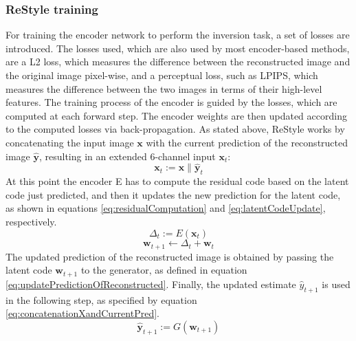 \subsubsection{ReStyle training}
For training the encoder network to perform the inversion task, a set of losses are introduced. The losses used, which are also used by most encoder-based methods, are a L2 loss, which measures the difference between the reconstructed image and the original image pixel-wise, and a perceptual loss, such as LPIPS, which measures the difference between the two images in terms of their high-level features. The training process of the encoder is guided by the losses, which are computed at each forward step. The encoder weights are then updated according to the computed losses via back-propagation. As stated above, ReStyle works by concatenating the input image $\textbf{x}$ with the current prediction of the reconstructed image $\hat{\textbf{y}}$, resulting in an extended 6-channel input $\textbf{x}_t$:
\begin{equation}
\label{eq:concatenationXandCurrentPred}
    \textbf{x}_t := \textbf{x} \| \hat{\textbf{y}}_t
\end{equation}
At this point the encoder E has to compute the residual code based on the latent code just predicted, and then it updates the new prediction for the latent code, as shown in equations \ref{eq:residualComputation} and \ref{eq:latentCodeUpdate}, respectively.
\begin{equation}
    \label{eq:residualComputation}
    \Delta_t := E(\textbf{x}_t)
\end{equation}
\begin{equation}
    \label{eq:latentCodeUpdate}
    \textbf{w}_{t+1} \xleftarrow{} \Delta_t + \textbf{w}_t
\end{equation}
The updated prediction of the reconstructed image is obtained by passing the latent code $\textbf{w}_{t+1}$ to the generator, as defined in equation \ref{eq:updatePredictionOfReconstructed}. Finally, the updated estimate $\hat{y}_{t+1}$ is used in the following step, as specified by equation \ref{eq:concatenationXandCurrentPred}.
\begin{equation}
    \label{eq:updatePredictionOfReconstructed}
    \hat{\textbf{y}}_{t+1} := G(\textbf{w}_{t+1})
\end{equation}

